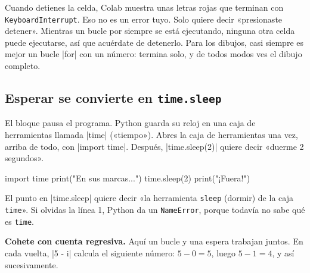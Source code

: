 \begin{watchout}
Cuando detienes la celda, Colab muestra unas letras rojas que terminan con \texttt{KeyboardInterrupt}. Eso no es un error tuyo. Solo quiere decir «presionaste detener». Mientras un bucle por siempre se está ejecutando, ninguna otra celda puede ejecutarse, así que acuérdate de detenerlo. Para los dibujos, casi siempre es mejor un bucle \py|for| con un número: termina solo, y de todos modos ves el dibujo completo.
\end{watchout}

\subsection*{Esperar se convierte en \texttt{time.sleep}}

El bloque  pausa el programa. Python guarda su reloj en una caja de herramientas llamada \py|time| («tiempo»). Abres la caja de herramientas una vez, arriba de todo, con \py|import time|. Después, \py|time.sleep(2)| quiere decir «duerme 2 segundos».

\begin{tcbraster}[raster columns=2, raster equal height=rows, raster column skip=12pt, raster valign=center]
\begin{tcolorbox}[colback=white, colframe=white, boxrule=0pt, valign=center]
\begin{scratch}[scale=0.85]
\end{scratch}
\end{tcolorbox}
\begin{code}
import time
print("En sus marcas...")
time.sleep(2)
print("¡Fuera!")
\end{code}
\end{tcbraster}

El punto en \py|time.sleep| quiere decir «la herramienta \texttt{sleep} (dormir) de la caja \texttt{time}». Si olvidas la línea 1, Python da un \texttt{NameError}, porque todavía no sabe qué es \texttt{time}.

\textbf{Cohete con cuenta regresiva.} Aquí un bucle y una espera trabajan juntos. En cada vuelta, \py|5 - i| calcula el siguiente número: $5-0=5$, luego $5-1=4$, y así sucesivamente.

